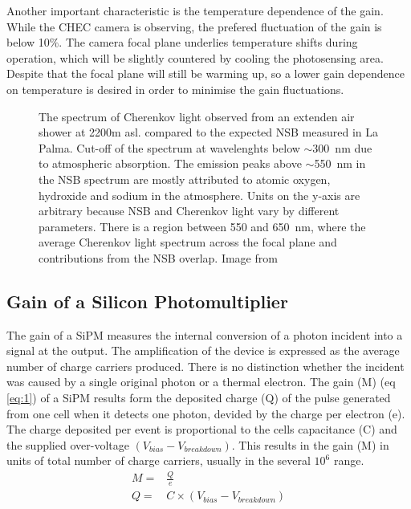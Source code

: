 \documentclass[12pt,article,type=msc,colorback,accentcolor=tud9c]{tudthesis}
\begin{document}
Another important characteristic is the temperature dependence of the gain. While the CHEC camera is observing, the prefered fluctuation of the gain is below 10$\%$. The camera focal plane underlies temperature shifts during operation, which will be slightly countered by cooling the photosensing area. Despite that the focal plane will still be warming up, so a lower gain dependence on temperature is desired in order to minimise the gain fluctuations.


\begin{figure}[t!]
\begin{centering}
\caption[Cherenkov light spectrum]{The spectrum of Cherenkov light observed from an extenden air shower at 2200m asl. compared to the expected NSB measured in La Palma. Cut-off of the spectrum at wavelenghts below $\sim$300~nm due to atmospheric absorption. The emission peaks above $\sim$550~nm in the NSB spectrum are mostly attributed to atomic oxygen, hydroxide and sodium in the atmosphere. Units on the y-axis are arbitrary because NSB and Cherenkov light vary by different parameters. There is a region between 550 and 650~nm, where the average Cherenkov light spectrum across the focal plane and contributions from the NSB overlap. Image from \cite{SiPMvsMAPMT}}
\label{fig:Cherenkov_NSB}
\end{centering}
\end{figure}


\subsection{Gain of a Silicon Photomultiplier}
\label{subsec:SiPMGain}
The gain of a SiPM measures the internal conversion of a photon incident into a signal at the output. The amplification of the device is expressed as the average number of charge carriers produced. There is no distinction whether the incident was caused by a single original photon or a thermal electron. The gain (M) (eq \ref{eq:1}) of a SiPM results form the deposited charge (Q) of the pulse generated from one cell when it detects one photon, devided by the charge per electron (e). The charge deposited per event is proportional to the cells capacitance (C) and the supplied over-voltage $(V_{bias}-V_{breakdown})$.\cite{SiPMvsMAPMT} This results in the gain (M) in units of total number of charge carriers, usually in the several $10^6$ range.
\begin{equation}\label{eq:1}
\begin{split}
M = & \frac{Q}{e} \\
Q = &  C \times (V_{bias}-V_{breakdown})
\end{split}
\end{equation}
\end{document}
